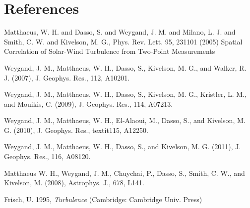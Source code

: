 \documentclass[aip,prl,amsmath,amssymb,reprint,superscriptaddress]{revtex4-1} %
\begin{document}
\section*{References}
\begin{thebibliography}{99}


Matthaeus, W. H. and Dasso, S. and Weygand, J. M. and Milano, L. J. and Smith, C. W. and Kivelson, M. G., Phys. Rev. Lett. 95, 231101 (2005) Spatial Correlation of Solar-Wind Turbulence from Two-Point Measurements

Weygand, J. M., Matthaeus, W. H., Dasso, S., Kivelson, M. G.,
and Walker, R. J. (2007), J. Geophys. Res., 112, A10201.

Weygand, J. M., Matthaeus, W. H., Dasso, S., Kivelson, M. G.,
Kristler, L. M., and Mouikis, C. (2009), J. Geophys. Res., 114,
A07213.

Weygand, J. M., Matthaeus, W. H., El-Alaoui, M., Dasso, S., and
Kivelson, M. G. (2010), J. Geophys. Res., textit115, A12250.

Weygand, J. M., Matthaeus, W. H., Dasso, S., and Kivelson, M.
G. (2011), J. Geophys. Res., 116, A08120.

Matthaeus W. H., Weygand, J. M., Chuychai, P., Dasso, S.,
Smith, C. W., and Kivelson, M. (2008), Astrophys. J., 678,
L141.

Frisch, U. 1995, {\it Turbulence} (Cambridge: Cambridge Univ. Press)








\end{thebibliography}
\end{document}
